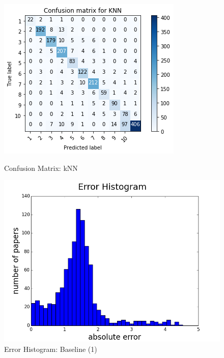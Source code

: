 \documentclass[a4paper, 11pt]{article}
\begin{document}
\vspace{0.5cm}

\begin{figure}[!htb] 
%
  \includegraphics[width=\linewidth]{confmat_knn_new.png}
    \caption{Confusion Matrix: kNN}
  \label{fig:confmat_knn}
\endminipage\hfill
{}%
  \includegraphics[width=\linewidth]{error_hist_linear_old.png}
   \caption{Error Histogram: Baseline (1)}
  \label{fig:error_hist_linear_old}
\endminipage\hfill
\end{figure}
\end{document}
